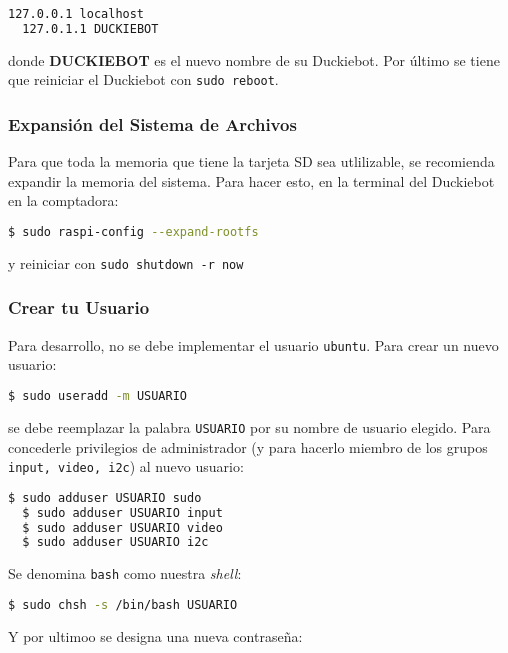 \documentclass[12pt]{article}
\begin{document}
\begin{lstlisting}[language=bash]
  127.0.0.1	localhost
  127.0.1.1 DUCKIEBOT
\end{lstlisting}

donde \textbf{DUCKIEBOT} es el nuevo nombre de su Duckiebot. Por último se tiene que reiniciar el Duckiebot con \texttt{sudo reboot}.

\subsubsection{Expansión del Sistema de Archivos}

Para que toda la memoria que tiene la tarjeta SD sea utlilizable, se recomienda expandir la memoria del sistema. Para hacer esto, en la terminal del Duckiebot en la comptadora:

\begin{lstlisting}[language=bash]
  $ sudo raspi-config --expand-rootfs
\end{lstlisting}

y reiniciar con \texttt{sudo shutdown -r now}

\subsubsection{Crear tu Usuario}

Para desarrollo, no se debe implementar el usuario \texttt{ubuntu}. Para crear un nuevo usuario:


\begin{lstlisting}[language=bash]
  $ sudo useradd -m USUARIO
\end{lstlisting}

se debe reemplazar la palabra \texttt{USUARIO} por su nombre de usuario elegido. Para concederle privilegios de administrador (y para hacerlo miembro de los grupos \texttt{input, video, i2c}) al nuevo usuario:

\begin{lstlisting}[language=bash]
  $ sudo adduser USUARIO sudo
  $ sudo adduser USUARIO input
  $ sudo adduser USUARIO video
  $ sudo adduser USUARIO i2c
\end{lstlisting}

Se denomina \texttt{bash} como nuestra \textit{shell}:

\begin{lstlisting}[language=bash]
  $ sudo chsh -s /bin/bash USUARIO
\end{lstlisting}

Y por ultimoo se designa una nueva contraseña:
\end{document}
